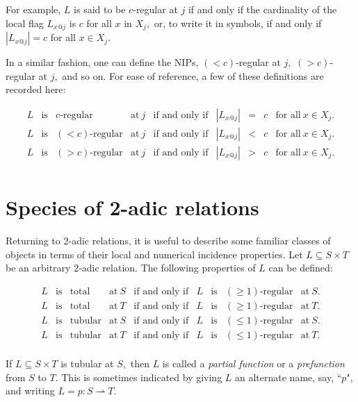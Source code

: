 \documentclass[12pt]{article}
\begin{document}
For example, $L$ is said to be $c$-regular at $j$ if and only if the cardinality of the local flag $L_{x@j}$ is $c$ for all $x$ in $X_j,$ or, to write it in symbols, if and only if $|L_{x@j}| = c$ for all $x \in X_j.$

In a similar fashion, one can define the NIPs, $(< c)$-regular at $j,$ $(> c)$-regular at $j,$ and so on.  For ease of reference, a few of these definitions are recorded here:

\[ \begin{array}{ccccccccc}
L & \text{is} & c\text{-regular} & \text{at}\ j & \text{if and only if} & |L_{x@j}| & = & c & \text{for all}\ x \in X_j. \\
L & \text{is} & (< c)\text{-regular} & \text{at}\ j & \text{if and only if} & |L_{x@j}| & < & c & \text{for all}\ x \in X_j. \\
L & \text{is} & (> c)\text{-regular} & \text{at}\ j & \text{if and only if} & |L_{x@j}| & > & c & \text{for all}\ x \in X_j. \\
\end{array} \]

\section{Species of 2-adic relations}

Returning to 2-adic relations, it is useful to describe some familiar classes of objects in terms of their local and numerical incidence properties.  Let $L \subseteq S \times T$ be an arbitrary 2-adic relation.  The following properties of $L$ can be defined:

\[ \begin{array}{ccccccccc}
L & \text{is} & \text{total} & \text{at}\ S & \text{if and only if} & L & \text{is} & (\ge 1)\text{-regular} & \text{at}\ S . \\
L & \text{is} & \text{total} & \text{at}\ T & \text{if and only if} & L & \text{is} & (\ge 1)\text{-regular} & \text{at}\ T . \\
L & \text{is} & \text{tubular} & \text{at}\ S & \text{if and only if} & L & \text{is} & (\le 1)\text{-regular} & \text{at}\ S . \\
L & \text{is} & \text{tubular} & \text{at}\ T & \text{if and only if} & L & \text{is} & (\le 1)\text{-regular} & \text{at}\ T . \\
\end{array} \]

If $L \subseteq S \times T$ is tubular at $S,$ then $L$ is called a \textit{partial function} or a \textit{prefunction} from $S$ to $T.$  This is sometimes indicated by giving $L$ an alternate name, say, ``$p$", and writing $L = p : S \rightharpoonup T.$
\end{document}
